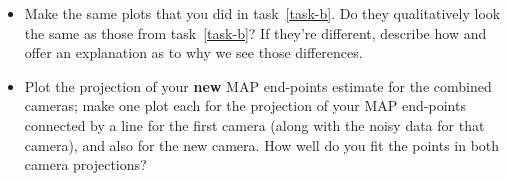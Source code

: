 \documentclass[10pt]{article}
\begin{document}
\begin{enumerate}
\begin{itemize}
\item Make the same plots that you did in task~\ref{task-b}.  Do they qualitatively look the same as those from task~\ref{task-b}?  If they're different, describe how and offer an explanation as to why we see those differences.


\item Plot the projection of your {\bf new} MAP end-points estimate for the combined cameras; make one plot each for the projection of your MAP end-points connected by a line for the first camera (along with the noisy data for that camera), and also for the new camera.  How well do you fit the points in both camera projections?


\end{itemize}

\end{enumerate}
\end{document}
